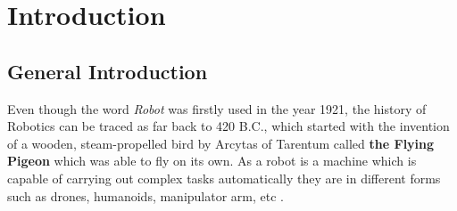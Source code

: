 \chapter{Introduction}
\section{General Introduction}
Even though the word \textit{Robot} was firstly used in the year 1921, the history of Robotics can be traced as far back to 420 B.C., which started with the invention of a wooden, steam-propelled bird by Arcytas of Tarentum called \textbf{the Flying Pigeon} which was able to fly on its own.
As a robot is a machine which is capable of carrying out complex tasks automatically they are in different forms such as drones, humanoids, manipulator arm, etc \cite{latombe1991}.

